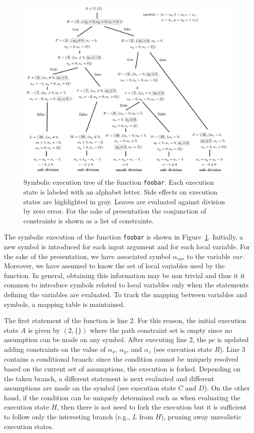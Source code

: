 \begin{figure}[t]
  \centering
  \includegraphics[width=1.0\columnwidth]{images/example} 
  \caption{Symbolic execution tree of the function {\tt foobar}. Each execution state is labeled with an alphabet letter. Side effects on execution states are highlighted in gray. Leaves are evaluated against division by zero error. For the sake of presentation the conjunction of constraints is shown as a list of constraints. }
  \label{fig:example-symbolic-execution}
\end{figure}

The symbolic execution of the function {\tt foobar} is shown in Figure~\ref{fig:example-symbolic-execution}. Initially, a new symbol is introduced for each input argument and for each local variable. For the sake of the presentation, we have associated symbol $\alpha_{var}$ to the variable $var$. Moreover, we have assumed to know the set of local variables used by the function. In general, obtaining this information may be non trivial and thus it it common to introduce symbols related to local variables only when the statements defining the variables are evaluated. To track the mapping between variables and symbols, a mapping table is maintained. 

The first statement of the function is line 2. For this reason, the initial execution state $A$ is given by $(2, \{\})$ where the path constraint set is empty since no assumption can be made on any symbol. After executing line 2, the $pc$ is updated adding constraints on the value of $\alpha_x$, $\alpha_y$, and $\alpha_z$ (see execution state $B$). Line 3 contains a conditional branch: since the condition cannot be uniquely resolved based on the current set of assumptions, the execution is forked. Depending on the taken branch, a different statement is next evaluated and different assumptions are made on the symbol (see execution state $C$ and $D$). On the other hand, if the condition can be uniquely determined such as when evaluating the execution state $H$, then there is not need to fork the execution but it is sufficient to follow only the interesting branch (e.g., $L$ from $H$), pruning away unrealistic execution states. 

